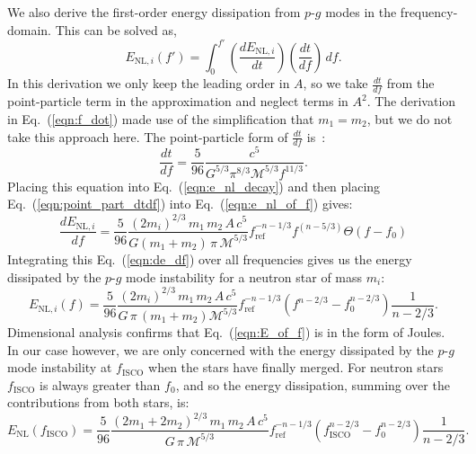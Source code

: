 We also derive the first-order energy dissipation from $p$-$g$ modes in the frequency-domain. This can be solved as, 
\begin{equation}\label{eqn:e_nl_of_f}
    E_{\mathrm{NL}, i}\left(f'\right) = \int_0^{f'} \left(\frac{dE_{\mathrm{NL}, i}}{dt} \right) \left(\frac{dt}{df}\right) \, df.
\end{equation}
In this derivation we only keep the leading order in $A$, so we take $\frac{dt}{df}$ from the point-particle term in the approximation and neglect terms in $A^2$. The derivation in Eq.~(\ref{eqn:f_dot}) made use of the simplification that $m_1 = m_2$, but we do not take this approach here. The point-particle form of $\frac{dt}{df}$ is~\citep{maggiore2008gravitational}:
\begin{equation}\label{eqn:point_part_dtdf}
    \frac{dt}{df} = \frac{5}{96} \frac{c^5}{G^{5/3}  \pi^{8/3} \mathcal{M}^{5/3} f^{11/3}}.
\end{equation}
Placing this equation into Eq.~(\ref{eqn:e_nl_decay}) and then placing Eq.~(\ref{eqn:point_part_dtdf}) into Eq.~(\ref{eqn:e_nl_of_f}) gives:
\begin{equation}\label{eqn:de_df}
    \frac{dE_{\mathrm{NL}, i}}{df} = \frac{5}{96} \frac{\left(2 m_i\right)^{2/3} \, m_1 \, m_2 \, A \, c^5}{G (m_1 + m_2)\, \pi \, \mathcal{M}^{5/3}} f_{\mathrm{ref}}^{-n-1/3} f^{(n-5/3)} \Theta(f-f_0)
\end{equation}
Integrating this Eq.~(\ref{eqn:de_df}) over all frequencies gives us the energy dissipated by the $p$-$g$ mode instability for a neutron star of mass $m_i$:
\begin{equation}\label{eqn:E_of_f}
    E_{\mathrm{NL}, i}(f) = \frac{5}{96} \frac{\left(2 m_i\right)^{2/3} \, m_1 \, m_2 \, A \, c^5}{G \, \pi \, (m_1 + m_2) \mathcal{M}^{5/3}} f_{\mathrm{ref}}^{-n-1/3} \left(f^{n-2/3} -f_0^{n-2/3}\right) \frac{1}{n-2/3}.
\end{equation}
Dimensional analysis confirms that Eq.~(\ref{eqn:E_of_f}) is in the form of Joules. In our case however, we are only concerned with the energy dissipated by the $p$-$g$ mode instability at $f_{\mathrm{ISCO}}$ when the stars have finally merged. For neutron stars $f_{\mathrm{ISCO}}$ is always greater than $f_0$, and so the energy dissipation, summing over the contributions from both stars, is:
\begin{equation}\label{eqn:E_of_fisco}
    E_{\mathrm{NL}}(f_{\mathrm{ISCO}}) =  \frac{5}{96} \frac{\left(2 m_1 + 2 m_2 \right)^{2/3} \, m_1 \, m_2 \, A \, c^5}{G \, \pi \, \mathcal{M}^{5/3}} f_{\mathrm{ref}}^{-n-1/3} \left(f_{\mathrm{ISCO}}^{n-2/3} -f_0^{n-2/3}\right) \frac{1}{n-2/3}.
\end{equation}

